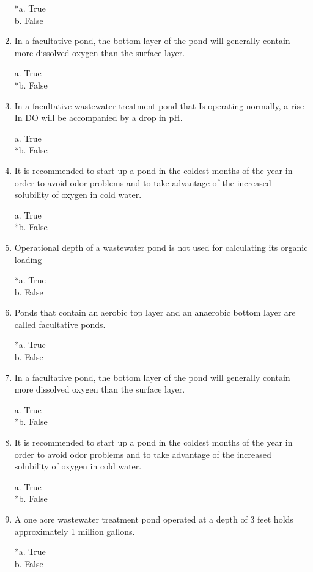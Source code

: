 \begin{enumerate}
*a. True \\
b. False 


\item  In a facultative pond, the bottom layer of the pond will generally contain more dissolved oxygen than the surface layer. 

a. True \\
*b. False 


\item  In a facultative wastewater treatment pond that Is operating normally, a rise In DO will be accompanied by a drop in pH. 

a. True \\
*b. False 


\item  It is recommended to start up a pond in the coldest months of the year in order to avoid odor problems and to take advantage of the increased solubility of oxygen in cold water. 

a. True \\
*b. False 


\item  Operational depth of a wastewater pond is not used for calculating its organic loading 

*a. True \\
b. False 


\item  Ponds that contain an aerobic top layer and an anaerobic bottom layer are called facultative ponds. 

*a. True \\
b. False 


\item  In a facultative pond, the bottom layer of the pond will generally contain more dissolved oxygen than the surface layer. 

a. True \\
*b. False 


\item  It is recommended to start up a pond in the coldest months of the year in order to avoid odor problems and to take advantage of the increased solubility of oxygen in cold water. 

a. True \\
*b. False 


\item  A one acre wastewater treatment pond operated at a depth of 3 feet holds approximately 1 million gallons. 

*a. True \\
b. False 



\end{enumerate}
